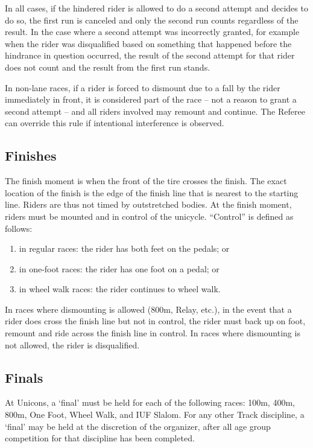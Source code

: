 In all cases, if the hindered rider is allowed to do a second attempt and decides to do so, the first run is canceled and only the second run counts regardless of the result.
In the case where a second attempt was incorrectly granted, for example when the rider was disqualified based on something that happened before the hindrance in question occurred, the result of the second attempt for that rider does not count and the result from the first run stands.

In non-lane races, if a rider is forced to dismount due to a fall by the rider immediately in front, it is considered part of the race -- not a reason to grant a second attempt -- and all riders involved may remount and continue.
The Referee can override this rule if intentional interference is observed.

\subsection{Finishes \label{sec:track_finishes}}

The finish moment is when the front of the tire crosses the finish.
The exact location of the finish is the edge of the finish line that is nearest to the starting line.
Riders are thus not timed by outstretched bodies.
At the finish moment, riders must be mounted and in control of the unicycle.
``Control'' is defined as follows:
\begin{enumerate}[label=(\alph*)]
\item in regular races: the rider has both feet on the pedals; or
\item in one-foot races: the rider has one foot on a pedal; or
\item in wheel walk races: the rider continues to wheel walk.
\end{enumerate}
In races where dismounting is allowed (800m, Relay, etc.\@), in the event that a rider does cross the finish line but not in control, the rider must back up on foot, remount and ride across the finish line in control.
In races where dismounting is not allowed, the rider is disqualified.

\subsection{Finals}

At Unicons, a `final' must be held for each of the following races: 100m, 400m, 800m, One Foot, Wheel Walk, and IUF Slalom.
For any other Track discipline, a `final' may be held at the discretion of the organizer, after all age group competition for that discipline has been completed.

